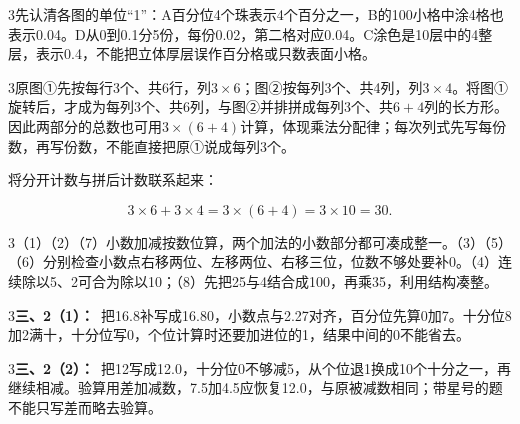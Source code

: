 \documentclass[multi=snippet,border={5bp 20bp 5bp 5bp}]{standalone}
\newenvironment{snippet}[3]{\begin{minipage}{#1bp}\color{answerred}\fontsize{#2}{#3}\selectfont\raggedright}{\end{minipage}}
\begin{document}
\begin{snippet}{505}{11.5}{14}\begin{multicols}{3}\raggedcolumns 先认清各图的单位“1”：A百分位4个珠表示4个百分之一，B的100小格中涂4格也表示0.04。D从0到0.1分5份，每份0.02，第二格对应0.04。C涂色是10层中的4整层，表示0.4，不能把立体厚层误作百分格或只数表面小格。\end{multicols}\end{snippet}
\begin{snippet}{505}{11.5}{14}\begin{multicols}{3}\raggedcolumns 原图①先按每行3个、共6行，列\(3\times6\)\allowbreak ；图②按每列3个、共4列，列\(3\times4\)\allowbreak 。将图①旋转后，才成为每列3个、共6列，与图②并排拼成每列3个、共\(6+4\)\allowbreak 列的长方形。因此两部分的总数也可用\(3\times(6+4)\)\allowbreak 计算，体现乘法分配律；每次列式先写每份数，再写份数，不能直接把原①说成每列3个。\par 将分开计数与拼后计数联系起来：\end{multicols}\[3\times6+3\times4=3\times(6+4)=3\times10=30.\]\end{snippet}
\begin{snippet}{505}{11.5}{14}\begin{multicols}{3}\raggedcolumns （1）（2）（7）小数加减按数位算，两个加法的小数部分都可凑成整一。（3）（5）（6）分别检查小数点右移两位、左移两位、右移三位，位数不够处要补0。（4）连续除以5、2可合为除以10；（8）先把25与4结合成100，再乘35，利用结构凑整。\end{multicols}\end{snippet}
\begin{snippet}{505}{11.5}{14}\begin{multicols}{3}\raggedcolumns \textbf{三、2（1）：}\ 把16.8补写成16.80，小数点与2.27对齐，百分位先算0加7。十分位8加2满十，十分位写0，个位计算时还要加进位的1，结果中间的0不能省去。\end{multicols}\end{snippet}
\begin{snippet}{505}{11.5}{14}\begin{multicols}{3}\raggedcolumns \textbf{三、2（2）：}\ 把12写成12.0，十分位0不够减5，从个位退1换成10个十分之一，再继续相减。验算用差加减数，7.5加4.5应恢复12.0，与原被减数相同；带星号的题不能只写差而略去验算。\end{multicols}\end{snippet}
\end{document}
